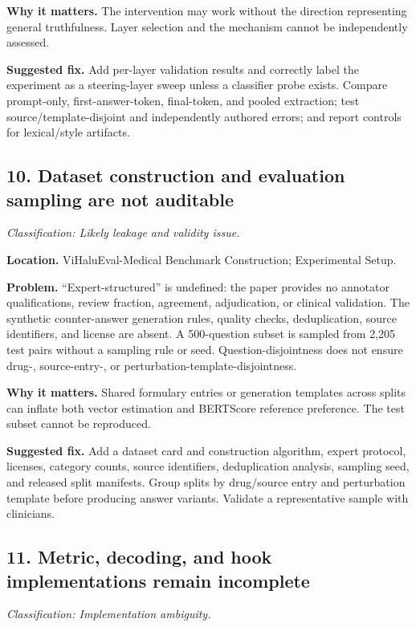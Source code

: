 \documentclass[11pt]{article}
\newcommand{\findinglabel}[1]{\textbf{#1}}
\newcommand{\classification}[1]{\textit{Classification: #1.}}
\begin{document}
\findinglabel{Why it matters.} The intervention may work without the direction representing general truthfulness.  Layer selection and the mechanism cannot be independently assessed.

\findinglabel{Suggested fix.} Add per-layer validation results and correctly label the experiment as a steering-layer sweep unless a classifier probe exists.  Compare prompt-only, first-answer-token, final-token, and pooled extraction; test source/template-disjoint and independently authored errors; and report controls for lexical/style artifacts.

\subsection*{10. Dataset construction and evaluation sampling are not auditable}

\classification{Likely leakage and validity issue}

\findinglabel{Location.} ViHaluEval-Medical Benchmark Construction; Experimental Setup.

\findinglabel{Problem.} ``Expert-structured'' is undefined: the paper provides no annotator qualifications, review fraction, agreement, adjudication, or clinical validation.  The synthetic counter-answer generation rules, quality checks, deduplication, source identifiers, and license are absent.  A 500-question subset is sampled from 2,205 test pairs without a sampling rule or seed.  Question-disjointness does not ensure drug-, source-entry-, or perturbation-template-disjointness.

\findinglabel{Why it matters.} Shared formulary entries or generation templates across splits can inflate both vector estimation and BERTScore reference preference.  The test subset cannot be reproduced.

\findinglabel{Suggested fix.} Add a dataset card and construction algorithm, expert protocol, licenses, category counts, source identifiers, deduplication analysis, sampling seed, and released split manifests.  Group splits by drug/source entry and perturbation template before producing answer variants.  Validate a representative sample with clinicians.

\subsection*{11. Metric, decoding, and hook implementations remain incomplete}

\classification{Implementation ambiguity}
\end{document}
